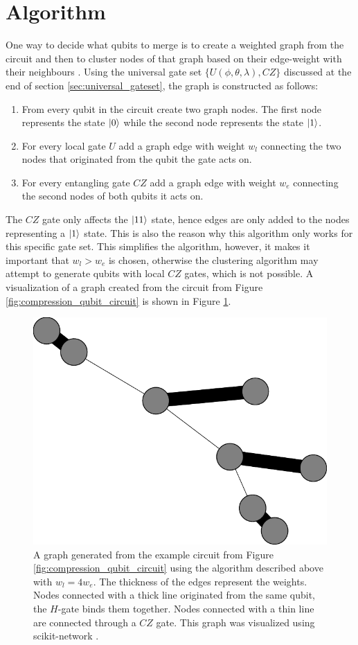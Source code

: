 \section{Algorithm}
  One way to decide what qubits to merge is to create a weighted graph from the circuit and then to cluster nodes of that graph based on their edge-weight with their neighbours \cite{gao2023role}. Using the universal gate set $\{U(\phi,\theta,\lambda), CZ\}$ discussed at the end of section \ref{sec:universal_gateset}, the graph is constructed as follows:
  \begin{enumerate}
    \item From every qubit in the circuit create two graph nodes. The first node represents the state $\ket{0}$ while the second node represents the state $\ket{1}$.
    \item For every local gate $U$ add a graph edge with weight $w_l$ connecting the two nodes that originated from the qubit the gate acts on.
    \item For every entangling gate $CZ$ add a graph edge with weight $w_e$ connecting the second nodes of both qubits it acts on.
  \end{enumerate}
  The $CZ$ gate only affects the $\ket{11}$ state, hence edges are only added to the nodes representing a $\ket{1}$ state. This is also the reason why this algorithm only works for this specific gate set. This simplifies the algorithm, however, it makes it important that $w_l>w_e$ is chosen, otherwise the clustering algorithm may attempt to generate qubits with local $CZ$ gates, which is not possible. A visualization of a graph created from the circuit from Figure \ref{fig:compression_qubit_circuit} is shown in Figure \ref{fig:graph_from_qubit_circuit}.
  \begin{figure}[H]
    \centering
    \includegraphics*[width=.25\textwidth]{figures/graphs/evolution-0/graph_w.pdf}
    \caption{A graph generated from the example circuit from Figure \ref{fig:compression_qubit_circuit} using the algorithm described above with $w_l=4w_e$. The thickness of the edges represent the weights. Nodes connected with a thick line originated from the same qubit, the $H$-gate binds them together. Nodes connected with a thin line are connected through a $CZ$ gate. This graph was visualized using scikit-network \cite{JMLR:v21:20-412}.}
    \label{fig:graph_from_qubit_circuit}
  \end{figure}
